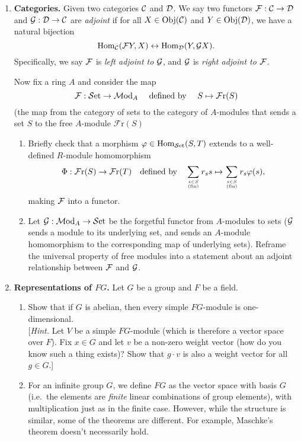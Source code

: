 \documentclass[11pt, reqno]{amsart}
\theoremstyle{plain}
\theoremstyle{definition}
\theoremstyle{example}
\def\Hom{\mathrm{Hom}}
\def\Fr{\mathcal{F}\mathrm{r}}
\def\f{\varphi}
\def\Obj{\mathrm{Obj}}
\def\Set{{\cS\mathrm{et}}}
\def\Set{{\cS\mathrm{et}}}
\def\Mod{{\cM\mathrm{od}}}
\begin{document}
\begin{enumerate}[1.]
\item  \textbf{Categories.} Given two categories $\mathcal{C}$ and $\mathcal{D}$. We say two functors $\mathcal{F}: \mathcal{C} \to \mathcal{D}$ and $\mathcal{G}: \mathcal{D} \to \mathcal{C}$ are \emph{adjoint} if for all $X \in \Obj(\cC)$ and $Y \in \Obj(\cD)$, we have a natural bijection 
	$$\Hom_{\cC}(\cF Y,X) \leftrightarrow \Hom_{\cD}(Y,\cG X).$$
	Specifically, we say $\mathcal{F}$ is \emph{left adjoint to $\mathcal{G}$}, and $\mathcal{G}$ is \emph{right adjoint to $\mathcal{F}$}. 
	
	
Now fix a ring $A$ and consider the map
$$\cF: \Set \to \Mod_A \quad \text{ defined by } \quad S \mapsto \Fr(S)$$ 
(the map from the category of sets to the category of $A$-modules that sends a set $S$ to the free $A$-module $\Fr(S)$ 

\begin{enumerate}
\item Briefly check that a morphism $\f \in \Hom_\Set(S, T)$ extends to a well-defined $R$-module homomorphism 
$$\Phi: \Fr(S) \to \Fr(T) \quad \text{defined by} \quad 
	\sum_{s \in S \atop \text{(fin)}} r_s s \mapsto \sum_{s \in S \atop \text{(fin)}} r_s \f(s),$$ 
making $\mathcal{F}$ into a functor.  
\item Let  $ \cG: \Mod_A \to \Set$ be the forgetful functor from $A$-modules to sets ($\mathcal{G}$ sends a module to its underlying set, and sends an $A$-module homomorphism to the corresponding map of underlying sets). Reframe the universal property of free modules into a statement about an adjoint relationship between $\mathcal{F}$ and $\mathcal{G}$. 
\end{enumerate}

\item \textbf{Representations of $FG$.}  Let $G$ be a group and $F$ be a field.

\begin{enumerate}
\item Show that if $G$ is abelian, then every simple $FG$-module is one-dimensional.\\
{[\emph{Hint.} Let $V$ be a simple $FG$-module (which is therefore a vector space over $F$). Fix $x \in G$ and let $v$ be a non-zero weight vector (how do you know such a thing exists)? Show that $g\cdot v$ is also a weight vector for all $g \in G$.]}
\item For an infinite group $G$, we define $FG$ as the vector space with basis $G$ (i.e.\ the elements are \emph{finite} linear combinations of group elements), with multiplication just as in the finite case. However, while the structure is similar, some of the theorems are different. For example, Maschke's theorem doesn't necessarily hold.


\end{enumerate}
\end{enumerate}
\end{document}
